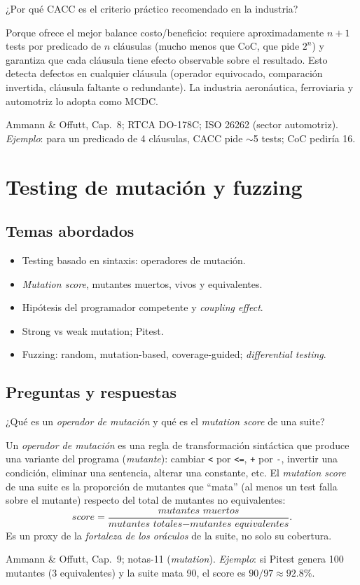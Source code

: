 \documentclass[11pt,a4paper]{article}
\newcounter{preg}
\newcommand{\qa}[3]{%
  \stepcounter{preg}%
  \vspace{0.4em}
  \begin{preguntabox}{\thepreg}
  #1
  \end{preguntabox}
  \begin{respuestabox}
  #2
  \end{respuestabox}
  \begin{refbox}
  #3
  \end{refbox}
  \vspace{0.6em}
}
\begin{document}
\qa{¿Por qué CACC es el criterio práctico recomendado en la industria?}
{Porque ofrece el mejor balance costo/beneficio: requiere aproximadamente $n+1$ tests por predicado de $n$ cláusulas (mucho menos que CoC, que pide $2^n$) y garantiza que cada cláusula tiene efecto observable sobre el resultado. Esto detecta defectos en cualquier cláusula (operador equivocado, comparación invertida, cláusula faltante o redundante). La industria aeronáutica, ferroviaria y automotriz lo adopta como MCDC.}
{Ammann \& Offutt, Cap.~8; RTCA DO-178C; ISO 26262 (sector automotriz). \emph{Ejemplo}: para un predicado de 4 cláusulas, CACC pide $\sim$5 tests; CoC pediría 16.}

\section{Testing de mutación y fuzzing}

\subsection*{Temas abordados}
\begin{itemize}[leftmargin=1.4em]
  \item Testing basado en sintaxis: operadores de mutación.
  \item \emph{Mutation score}, mutantes muertos, vivos y equivalentes.
  \item Hipótesis del programador competente y \emph{coupling effect}.
  \item Strong vs weak mutation; Pitest.
  \item Fuzzing: random, mutation-based, coverage-guided; \emph{differential testing}.
\end{itemize}

\subsection*{Preguntas y respuestas}

\qa{¿Qué es un \emph{operador de mutación} y qué es el \emph{mutation score} de una suite?}
{Un \emph{operador de mutación} es una regla de transformación sintáctica que produce una variante del programa (\emph{mutante}): cambiar \texttt{<} por \texttt{<=}, \texttt{+} por \texttt{-}, invertir una condición, eliminar una sentencia, alterar una constante, etc. El \emph{mutation score} de una suite es la proporción de mutantes que ``mata'' (al menos un test falla sobre el mutante) respecto del total de mutantes no equivalentes:
\[
\textit{score} = \frac{\textit{mutantes muertos}}{\textit{mutantes totales} - \textit{mutantes equivalentes}}.
\]
Es un proxy de la \emph{fortaleza de los oráculos} de la suite, no solo su cobertura.}
{Ammann \& Offutt, Cap.~9; notas-11 (\emph{mutation}). \emph{Ejemplo}: si Pitest genera 100 mutantes (3 equivalentes) y la suite mata 90, el score es $90/97 \approx 92.8\%$.}
\end{document}
